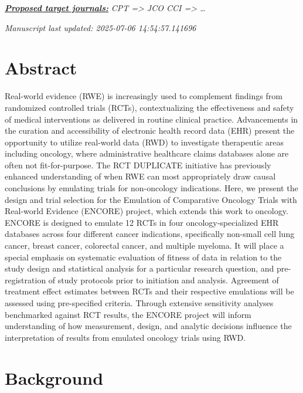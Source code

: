 \documentclass[
  letterpaper,
  DIV=11,
  numbers=noendperiod]{scrartcl}
\begin{document}
\ul{\textbf{\emph{Proposed target journals:}}} \emph{CPT =\textgreater{}
JCO CCI =\textgreater{} \ldots{}}

\emph{Manuscript last updated: 2025-07-06 14:54:57.141696}

\newpage{}

\section*{Abstract}\label{abstract}

Real-world evidence (RWE) is increasingly used to complement findings
from randomized controlled trials (RCTs), contextualizing the
effectiveness and safety of medical interventions as delivered in
routine clinical practice. Advancements in the curation and
accessibility of electronic health record data (EHR) present the
opportunity to utilize real-world data (RWD) to investigate therapeutic
areas including oncology, where administrative healthcare claims
databases alone are often not fit-for-purpose. The RCT DUPLICATE
initiative has previously enhanced understanding of when RWE can most
appropriately draw causal conclusions by emulating trials for
non-oncology indications. Here, we present the design and trial
selection for the Emulation of Comparative Oncology Trials with
Real-world Evidence (ENCORE) project, which extends this work to
oncology. ENCORE is designed to emulate 12 RCTs in four
oncology-specialized EHR databases across four different cancer
indications, specifically non-small cell lung cancer, breast cancer,
colorectal cancer, and multiple myeloma. It will place a special
emphasis on systematic evaluation of fitness of data in relation to the
study design and statistical analysis for a particular research
question, and pre-registration of study protocols prior to initiation
and analysis. Agreement of treatment effect estimates between RCTs and
their respective emulations will be assessed using pre-specified
criteria. Through extensive sensitivity analyses benchmarked against RCT
results, the ENCORE project will inform understanding of how
measurement, design, and analytic decisions influence the interpretation
of results from emulated oncology trials using RWD.

\newpage{}

\section{Background}\label{background}
\end{document}
